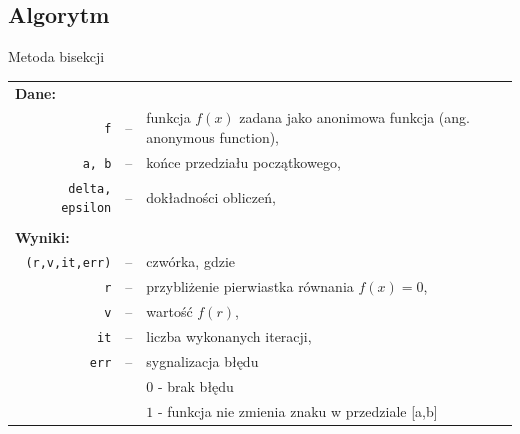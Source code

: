 \documentclass[10pt,a4paper, polish]{article}
\begin{document}
\subsection*{Algorytm}
\begin{algorithm}[H]
\caption{Metoda bisekcji}
\label{alg:bis}
\DontPrintSemicolon
{}
\end{algorithm}

\begin{longtable}[l]{r  c  l}
\multicolumn{1}{l}{\textbf{Dane:}}&& \\
\texttt{f}&--&funkcja $f(x)$ zadana jako anonimowa funkcja (ang. anonymous function), \\
\texttt{a, b}&--&końce przedziału początkowego, \\
\texttt{delta, epsilon}&--&dokładności obliczeń, \\
&& \\
\multicolumn{1}{l}{\textbf{Wyniki:}}&& \\
\texttt{(r,v,it,err)}&--&czwórka, gdzie \\
\texttt{r}&--&przybliżenie pierwiastka równania $f(x) = 0$, \\
\texttt{v}&--&wartość $f(r)$, \\
\texttt{it}&--&liczba wykonanych iteracji, \\
\texttt{err}&--&sygnalizacja błędu \\
&&$0$ - brak błędu \\
&&$1$ - funkcja nie zmienia znaku w przedziale [a,b] \\
\end{longtable}
\end{document}
